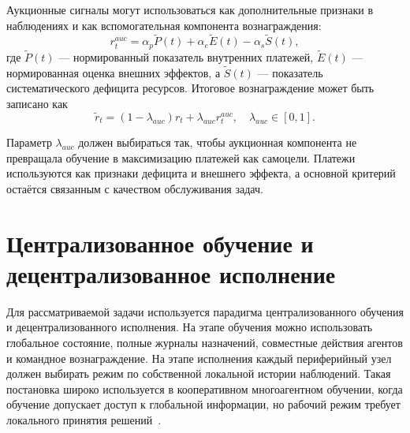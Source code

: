 Аукционные сигналы могут использоваться как дополнительные признаки в наблюдениях и как вспомогательная компонента вознаграждения:
\begin{equation}
    r^{auc}_t =
    \alpha_p \widetilde{P}(t)
    +
    \alpha_e \widetilde{E}(t)
    -
    \alpha_s \widetilde{S}(t),
    \label{eq:ch4_auc_reward}
\end{equation}
где $\widetilde{P}(t)$ --- нормированный показатель внутренних платежей, $\widetilde{E}(t)$ --- нормированная оценка внешних эффектов, а $\widetilde{S}(t)$ --- показатель систематического дефицита ресурсов. Итоговое вознаграждение может быть записано как
\begin{equation}
    \tilde{r}_t =
    (1-\lambda_{auc})r_t
    +
    \lambda_{auc} r^{auc}_t,
    \quad
    \lambda_{auc}\in[0,1].
    \label{eq:ch4_total_reward}
\end{equation}

Параметр $\lambda_{auc}$ должен выбираться так, чтобы аукционная компонента не превращала обучение в максимизацию платежей как самоцели. Платежи используются как признаки дефицита и внешнего эффекта, а основной критерий остаётся связанным с качеством обслуживания задач.

\section{Централизованное обучение и децентрализованное исполнение}

Для рассматриваемой задачи используется парадигма централизованного обучения и децентрализованного исполнения. На этапе обучения можно использовать глобальное состояние, полные журналы назначений, совместные действия агентов и командное вознаграждение. На этапе исполнения каждый периферийный узел должен выбирать режим по собственной локальной истории наблюдений. Такая постановка широко используется в кооперативном многоагентном обучении, когда обучение допускает доступ к глобальной информации, но рабочий режим требует локального принятия решений~\cite{Rashid2018QMIX,Zhang2021MARLSurvey}.

